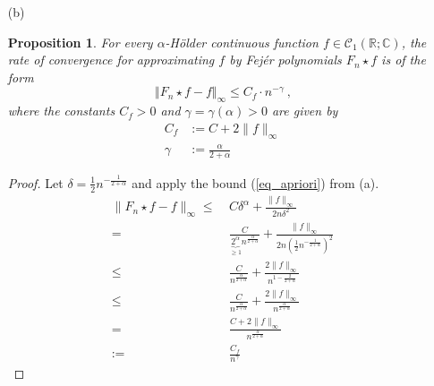 \documentclass[12pt, reqno]{article}
\newtheorem{prop}{Proposition}[section]
\theoremstyle{definition}
\theoremstyle{remark}
\begin{document}
\begin{itemize}
\begin{proof}
\end{proof}


\item[(b)] 

\begin{prop}

    For every $\alpha$-H\"older continuous function $f\in\mathcal{C}_1(\mathbb{R;C})$, the rate of convergence for approximating $f$ by Fej\'er polynomials $F_n\star f$ is of the form 
    \begin{equation} \label{eq_rateconv}
        \Vert F_n \star f - f  \Vert_\infty \leq C_f \cdot n^{-\gamma} ~\mbox{,}
        \end{equation}
    where the constants $C_f>0$ and $\gamma=\gamma(\alpha)>0$ are given by \begin{align}
        C_{f}&:= C+2\|f\|_{\infty}\\
        \gamma&:= \frac{\alpha}{2+\alpha}
    \end{align}

\end{prop}

\begin{proof}
    Let $\delta= \frac{1}{2}n^{- \frac{1}{2+\alpha}}$ and apply the bound (\ref{eq_apriori}) from (a).  \begin{align*}
        \|F_{n}\star f-f\|_{\infty}\le&~C\delta^{\alpha}+ \frac{\|f\|_{\infty}}{2n\delta^{2}}\\
        =&~\frac{C}{\underbrace{2^{\alpha}}_{\ge1}n^{ \frac{\alpha}{2+\alpha}}}+ \frac{\|f\|_{\infty}}{2n\left(\frac{1}{2} n^{- \frac{1}{2+\alpha}}\right)^{2}}\\
        \le&~\frac{C}{n^{\frac{\alpha}{2+\alpha}}}+ \frac{2\|f\|_{\infty}}{n^{1-\frac{2}{2+\alpha}}}\\
        \le&~\frac{C}{n^{\frac{\alpha}{2+\alpha}}}+ \frac{2\|f\|_{\infty}}{n^{\frac{\alpha}{2+\alpha}}}\\
        =&~\frac{C+2\|f\|_{\infty}}{n^{\frac{\alpha}{2+\alpha}}}\\
        :=&~\frac{C_{f}}{n^{\gamma}}
        \end{align*}
\end{proof}


\end{itemize}
\end{document}
